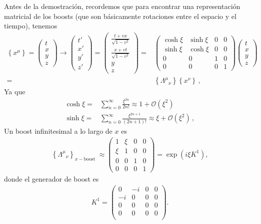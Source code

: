 \begin{frame}
Antes de la demostración, recordemos que
para encontrar una representación matricial de los boosts (que son básicamente rotaciones entre el espacio y el tiempo), tenemos
\begin{align}
  \left\{x^\mu\right\}=\begin{pmatrix}
    t\\
    x\\
    y\\
    z
  \end{pmatrix}\to
  \begin{pmatrix}
    t'\\
    x'\\
    y'\\
    z'
  \end{pmatrix}=
  \begin{pmatrix}
    \frac{t+vx}{\sqrt{1-v^2}}\\
    \frac{x+vt}{\sqrt{1-v^2}}\\
    y\\
    z
  \end{pmatrix}=&
  \begin{pmatrix}
    \cosh\xi&\sinh\xi&0&0\\
    \sinh\xi&\cosh\xi&0&0\\
    0     &  0  &1&0\\
    0     &  0  &0&1
  \end{pmatrix}
  \begin{pmatrix}
    t\\
    x\\
    y\\
    z
  \end{pmatrix}\nonumber\\
=&\left\{{\Lambda^\mu}_{\nu}\right\}\left\{x^\nu\right\}\,,
\end{align}
  Ya que
\begin{align}
  \cosh\xi=&\sum_{n=0}^{\infty}\frac{\xi^{2n}}{2n!}\approx 1+\mathcal{O}(\xi^2)\nonumber\\
  \sinh\xi=&\sum_{n=0}^{\infty}\frac{\xi^{2n+1}}{(2n+1)!}\approx \xi+\mathcal{O}(\xi^2)\,,
\end{align}
  Un boost infinitesimal a lo largo de $x$ es
\begin{align}
  \left\{{\Lambda^\mu}_{\nu}\right\}_{x-\text{boost }}\approx
  \begin{pmatrix}
    1&\xi&0&0\\
    \xi&1&0&0\\
    0&0&1&0\\
    0&0&0&1
  \end{pmatrix}=\exp \left( i\xi  K^1 \right),
\end{align}
donde el generador de boost es
\begin{align}
 K^1= \begin{pmatrix}
    0 & -i & 0 & 0\\
   -i & 0  & 0 & 0\\
   0 & 0 &  0 & 0\\
    0 & 0 &  0 & 0\\ 
  \end{pmatrix}.
\end{align}


\end{frame}
